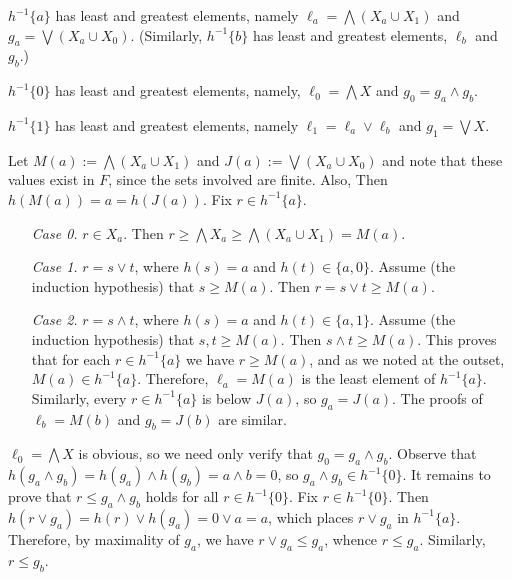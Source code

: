 \medskip

 $h^{-1}\{a\}$ has least and greatest elements, namely $\ell_a = \bigwedge (X_a \cup X_1)$ and $g_a = \bigvee (X_a\cup X_0)$.  (Similarly, 
$h^{-1}\{b\}$ has least and greatest elements, $\ell_b$ and $g_b$.)

\bigskip


 $h^{-1}\{0\}$ has least and greatest elements, 
namely, $\ell_0 = \bigwedge X$ and $g_0 = g_a \wedge g_b$.

\bigskip

 $h^{-1}\{1\}$ has least and greatest elements, namely $\ell_1 = \ell_a \vee \ell_b$ and $g_1 = \bigvee X$.


Let $M(a):=\bigwedge (X_a\cup X_1)$ and $J(a):=\bigvee (X_a\cup X_0)$ and 
note that these values exist in $F$, since the sets involved are finite. Also, 
Then $h(M(a)) = a = h(J(a))$. Fix $r \in h^{-1}\{a\}$.  
\begin{itemize}
\item[{\it Case 0.}] $r \in X_a$.  
   Then $r\geqslant \bigwedge X_a \geqslant \bigwedge (X_a\cup X_1) = M(a)$.

\item[{\it Case 1.}] $r = s \vee t$, where $h(s) = a$ and $h(t) \in \{a, 0\}$.  
Assume (the induction hypothesis) that $s \geqslant M(a)$. Then 
$r = s\vee t \geqslant M(a)$.

\item[{\it Case 2.}] $r = s \wedge t$, where $h(s) = a$ and $h(t) \in \{a, 1\}$.  
Assume (the induction hypothesis) that $s, t \geqslant M(a)$. 
Then $s \wedge t \geqslant M(a)$.
This proves that for each $r \in h^{-1}\{a\}$ we have $r \geqslant M(a)$, and 
as we noted at the outset, $M(a)\in h^{-1}\{a\}$. Therefore, $\ell_a = M(a)$ is the least element of $h^{-1}\{a\}$.
Similarly, every $r \in h^{-1}\{a\}$ is below $J(a)$, so $g_a = J(a)$.  The proofs of $\ell_b = M(b)$ and $g_b = J(b)$ are similar.
\end{itemize}

\medskip

$\ell_0 = \bigwedge X$ is obvious, so we need only verify that $g_0 = g_a \wedge g_b$. 
Observe that $h(g_a \wedge g_b) = h(g_a) \wedge h(g_b) = a \wedge b = 0$, so 
$g_a \wedge g_b \in h^{-1}\{0\}$. It remains to prove that $r \leqslant g_a \wedge g_b$ holds for all $r \in h^{-1}\{0\}$.
Fix $r \in h^{-1}\{0\}$. Then $h(r \vee g_a) = h(r) \vee h(g_a) = 0 \vee a = a$, which places $r \vee g_a$ in $h^{-1}\{a\}$.  Therefore, 
by maximality of $g_a$, we have $r \vee g_a  \leqslant g_a$, whence 
$r\leqslant g_a$.  Similarly, $r\leqslant g_b$.


